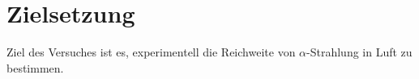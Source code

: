 \section{Zielsetzung}
\label{sec:zielsetzung}

Ziel des Versuches ist es, experimentell die Reichweite von $\alpha$-Strahlung in Luft zu bestimmen.
